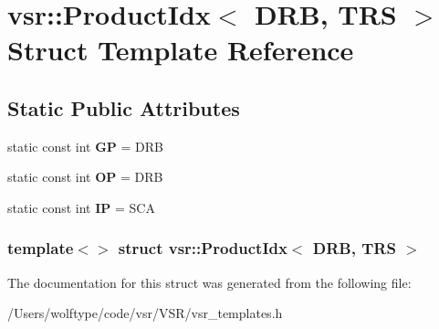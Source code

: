 \hypertarget{structvsr_1_1_product_idx_3_01_d_r_b_00_01_t_r_s_01_4}{\section{vsr\-:\-:Product\-Idx$<$ D\-R\-B, T\-R\-S $>$ Struct Template Reference}
\label{structvsr_1_1_product_idx_3_01_d_r_b_00_01_t_r_s_01_4}
}
\subsection*{Static Public Attributes}
\begin{DoxyCompactItemize}
\item 
\hypertarget{structvsr_1_1_product_idx_3_01_d_r_b_00_01_t_r_s_01_4_a9504ae873560c5ad0808cbdfa03d55f9}{static const int {\bfseries G\-P} = D\-R\-B}\label{structvsr_1_1_product_idx_3_01_d_r_b_00_01_t_r_s_01_4_a9504ae873560c5ad0808cbdfa03d55f9}

\item 
\hypertarget{structvsr_1_1_product_idx_3_01_d_r_b_00_01_t_r_s_01_4_adc0b134c26512ef093b186dc8d3ed53a}{static const int {\bfseries O\-P} = D\-R\-B}\label{structvsr_1_1_product_idx_3_01_d_r_b_00_01_t_r_s_01_4_adc0b134c26512ef093b186dc8d3ed53a}

\item 
\hypertarget{structvsr_1_1_product_idx_3_01_d_r_b_00_01_t_r_s_01_4_a206cffea1ac268b3e8555086d9b6cf3b}{static const int {\bfseries I\-P} = S\-C\-A}\label{structvsr_1_1_product_idx_3_01_d_r_b_00_01_t_r_s_01_4_a206cffea1ac268b3e8555086d9b6cf3b}

\end{DoxyCompactItemize}
\subsubsection*{template$<$$>$ struct vsr\-::\-Product\-Idx$<$ D\-R\-B, T\-R\-S $>$}



The documentation for this struct was generated from the following file\-:\begin{DoxyCompactItemize}
\item 
/\-Users/wolftype/code/vsr/\-V\-S\-R/vsr\-\_\-templates.\-h\end{DoxyCompactItemize}
